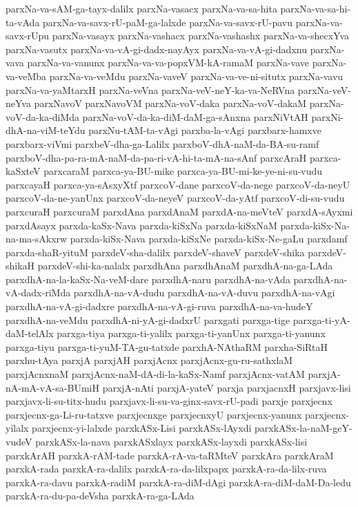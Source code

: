 {parxNa-va-sAM-ga-tayx-dalilx
parxNa-vasacx
parxNa-va-sa-hita
parxNa-va-sa-hi-ta-vAda
parxNa-va-savx-rU-paM-ga-lalxde
parxNa-va-savx-rU-pavu
parxNa-va-savx-rUpu
parxNa-vasayx
parxNa-vashacx
parxNa-vashashx
parxNa-va-shecxYva
parxNa-vasutx
parxNa-va-vA-gi-dadx-nayAyx
parxNa-va-vA-gi-dadxnu
parxNa-vava
parxNa-va-vanunx
parxNa-va-va-popxVM-kA-ramaM
parxNa-vave
parxNa-va-veMba
parxNa-va-veMdu
parxNa-vaveV
parxNa-va-ve-ni-situtx
parxNa-vavu
parxNa-va-yaMtarxH
parxNa-veVna
parxNa-veV-neY-ka-va-NeRVna
parxNa-veV-neYva
parxNavoV
parxNavoVM
parxNa-voV-daka
parxNa-voV-dakaM
parxNa-voV-da-ka-diMda
parxNa-voV-da-ka-diM-daM-ga-sAnxna
parxNiVtAH
parxNi-dhA-na-viM-teYdu
parxNu-tAM-ta-vAgi
parxba-la-vAgi
parxbarx-hamxve
parxbarx-viVmi
parxbeV-dha-ga-Lalilx
parxboV-dhA-naM-da-BA-su-ramf
parxboV-dha-pa-ra-mA-naM-da-pa-ri-vA-hi-ta-mA-na-sAnf
parxcAraH
parxca-kaSxteV
parxcaraM
parxca-ya-BU-mike
parxca-ya-BU-mi-ke-ye-ni-su-vudu
parxcayaH
parxca-ya-sAsxyXtf
parxcoV-dane
parxcoV-da-nege
parxcoV-da-neyU
parxcoV-da-ne-yanUnx
parxcoV-da-neyeV
parxcoV-da-yAtf
parxcoV-di-su-vudu
parxcuraH
parxcuraM
parxdAna
parxdAnaM
parxdA-na-meVteV
parxdA-sAyxmi
parxdAsayx
parxda-kaSx-Nava
parxda-kiSxNa
parxda-kiSxNaM
parxda-kiSx-Na-na-ma-sAkxrw
parxda-kiSx-Nava
parxda-kiSxNe
parxda-kiSx-Ne-gaLu
parxdamf
parxda-shaR-yituM
parxdeV-sha-dalilx
parxdeV-shaveV
parxdeV-shika
parxdeV-shikaH
parxdeV-shi-ka-nalalx
parxdhAna
parxdhAnaM
parxdhA-na-ga-LAda
parxdhA-na-la-kaSx-Na-veM-dare
parxdhA-naru
parxdhA-na-vAda
parxdhA-na-vA-dadx-riMda
parxdhA-na-vA-dudu
parxdhA-na-vA-duvu
parxdhA-na-vAgi
parxdhA-na-vA-gi-dadxre
parxdhA-na-vA-gi-ruva
parxdhA-na-va-hudeY
parxdhA-na-veMdu
parxdhA-ni-yA-gi-dadxrU
parxgati
parxga-tige
parxga-ti-yA-daM-telAlx
parxga-tiya
parxga-ti-yalilx
parxga-ti-yanUnx
parxga-ti-yanunx
parxga-tiyu
parxga-ti-yuM-TA-gu-tatxde
parxhA-NAthaRM
parxha-SiRtaH
parxhu-tAya
parxjA
parxjAH
parxjAcnx
parxjAcnx-gu-ru-sathxlaM
parxjAcnxnaM
parxjAcnx-naM-dA-di-la-kaSx-Namf
parxjAcnx-vatAM
parxjA-nA-mA-vA-sa-BUmiH
parxjA-nAti
parxjA-yateV
parxja
parxjacnxH
parxjavx-lisi
parxjavx-li-su-titx-hudu
parxjavx-li-su-va-ginx-savx-rU-padi
parxje
parxjecnx
parxjecnx-ga-Li-ru-tatxve
parxjecnxge
parxjecnxyU
parxjecnx-yanunx
parxjecnx-yilalx
parxjecnx-yi-lalxde
parxkASx-Lisi
parxkASx-lAyxdi
parxkASx-la-naM-geY-vudeV
parxkASx-la-nava
parxkASxlayx
parxkASx-layxdi
parxkASx-lisi
parxkArAH
parxkA-rAM-tade
parxkA-rA-va-taRMteV
parxkAra
parxkAraM
parxkA-rada
parxkA-ra-dalilx
parxkA-ra-da-lilxpapx
parxkA-ra-da-lilx-ruva
parxkA-ra-davu
parxkA-radiM
parxkA-ra-diM-dAgi
parxkA-ra-diM-daM-Da-ledu
parxkA-ra-du-pa-deVsha
parxkA-ra-ga-LAda
}
